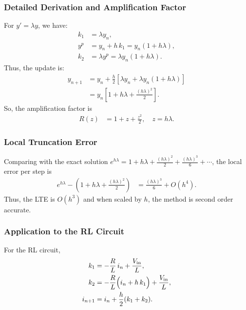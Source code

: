 \documentclass[12pt]{article}
\begin{document}
\subsubsection*{Detailed Derivation and Amplification Factor}
For $y'=\lambda y$, we have:
\begin{align}
k_1 &= \lambda y_n, \\
y^p &= y_n + h\, k_1 = y_n(1+h\lambda), \\
k_2 &= \lambda y^p = \lambda y_n(1+h\lambda).
\end{align}
Thus, the update is:
\begin{align}
y_{n+1} &= y_n + \frac{h}{2}\left[\lambda y_n + \lambda y_n(1+h\lambda)\right] \\
         &= y_n\left[ 1 + h\lambda + \frac{(h\lambda)^2}{2} \right].
\end{align}
So, the amplification factor is 
\begin{align}
R(z) &= 1+z+\frac{z^2}{2}, \quad z=h\lambda.
\end{align}

\subsubsection*{Local Truncation Error}
Comparing with the exact solution $e^{h\lambda} = 1+h\lambda+\frac{(h\lambda)^2}{2}+\frac{(h\lambda)^3}{6}+\cdots$, the local error per step is 
\begin{align}
e^{h\lambda} - \left(1+h\lambda+\frac{(h\lambda)^2}{2}\right) &= \frac{(h\lambda)^3}{6}+O(h^4).
\end{align}
Thus, the LTE is $O(h^3)$ and when scaled by $h$, the method is second order accurate.

\subsubsection*{Application to the RL Circuit}
For the RL circuit,
\begin{align}
k_1 &= -\frac{R}{L}\, i_n+\frac{V_{\text{in}}}{L}, \\
k_2 &= -\frac{R}{L}\Bigl(i_n+h\, k_1\Bigr)+\frac{V_{\text{in}}}{L}, \\
i_{n+1} &= i_n + \frac{h}{2}(k_1+k_2).
\end{align}
\end{document}

